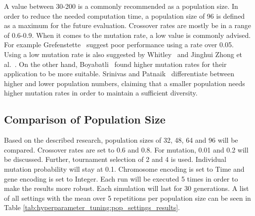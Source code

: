 A value between 30-200 is a commonly recommended as a population size. In order to reduce the needed computation time, a population size of 96 is defined as a maximum for the future evaluation. Crossover rates are mostly be in a range of 0.6-0.9. When it comes to the mutation rate, a low value is commonly advised. For example Grefenstette~\cite{grefenstette_optimization_1986} suggest poor performance using a rate over 0.05. Using a low mutation rate is also suggested by Whitley~\cite{whitley_genetic_1994} and Jinghui Zhong et al.~\cite{jinghui_zhong_comparison_2005}. On the other hand, Boyabatli~\cite{boyabatli_parameter_2004} found higher mutation rates for their application to be more suitable. Srinivas and Patnaik~\cite{srinivas_genetic_1994} differentiate between higher and lower population numbers, claiming that a smaller population needs higher mutation rates in order to maintain a sufficient diversity.

\subsection{Comparison of Population Size}
Based on the described research, population sizes of 32, 48, 64 and 96 will be compared. Crossover rates are set to 0.6 and 0.8. For mutation, 0.01 and 0.2 will be discussed. Further, tournament selection of 2 and 4 is used. Individual mutation probability will stay at 0.1. Chromosome encoding is set to Time and gene encoding is set to Integer.  Each run will be executed 5 times in order to make the results more robust. Each simulation will last for 30 generations. A list of all settings with the mean over 5 repetitions per population size can be seen in Table \ref{tab:hyperparameter_tuning:pop_settings_results}.

